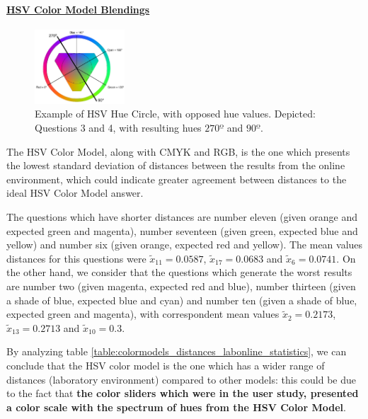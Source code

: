 \paragraph{\ul{HSV Color Model Blendings}} \par
\label{par:hsvcolormodel}
%
\begin{figure}
	\centering
    \vspace{-\baselineskip}
	  \includegraphics[width=0.3\textwidth]{images/results/HSV_hue.png}
    \caption[Example of HSV Hue Circle, with opposed hue values.]{Example of HSV Hue Circle, with opposed hue values. Depicted: Questions 3 and 4, with resulting hues $270º$ and $90º$.}
    \label{fig:hsvcircles_example}
\end{figure}
%
The HSV Color Model, along with CMYK and RGB, is the one which presents the lowest standard deviation of distances between the results from the online environment, which could indicate greater agreement between distances
 to the ideal HSV Color Model answer. \par
%
The questions which have shorter distances are number eleven (given orange and expected green and magenta), number seventeen (given green, expected blue and yellow) and number six (given orange,
expected red and yellow). The mean values distances for this questions were $\tilde{x}_{11} = 0.0587$, $\tilde{x}_{17} = 0.0683$ and $\tilde{x}_{6} = 0.0741$.
On the other hand, we consider that the questions which generate the worst results are number two (given magenta, expected red and blue), number thirteen (given a shade of blue, expected blue and cyan) and number
ten (given a shade of blue, expected green and magenta), with correspondent mean values $\tilde{x}_{2} = 0.2173$, $\tilde{x}_{13} = 0.2713$ and
$\tilde{x}_{10} = 0.3$. \par
%
By analyzing table \ref{table:colormodels_distances_labonline_statistics}, we can conclude that the HSV color model is the one which has a wider range of distances (laboratory environment) compared to other models:
this could be due to the fact that \textbf{the color sliders which were in the user study, presented a color scale with the spectrum of hues from the HSV Color Model}. \par
